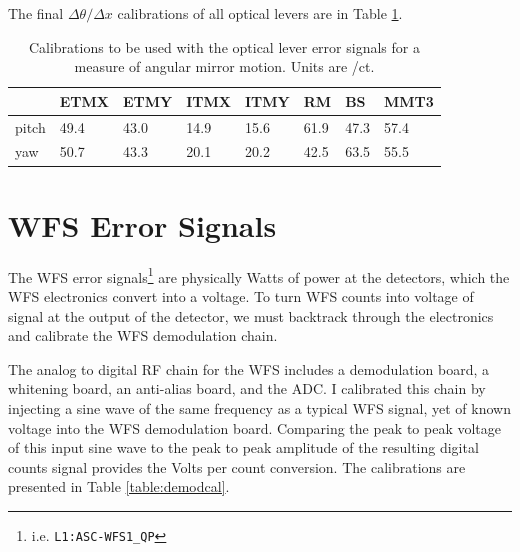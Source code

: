 The final $\Delta\theta / \Delta x$ calibrations of all optical levers
are in Table \ref{table:oplevcal}. 

\begin{table}
\centering
\caption[Optical lever calibrations]{Calibrations to be used
  with the optical lever error signals 
  for a measure of angular mirror motion. Units are \microrad/ct.}
\begin{tabular}{l l l l l l l l}
\hline
        & ETMX & ETMY & ITMX & ITMY & RM & BS & MMT3 \\
\hline
pitch & 49.4 & 43.0 & 14.9 & 15.6 & 61.9 & 47.3 & 57.4 \\
yaw & 50.7 & 43.3 & 20.1 & 20.2 & 42.5 & 63.5 & 55.5 \\
\hline
\end{tabular}
\label{table:oplevcal}
\end{table}



\section{WFS Error Signals}
\label{sec:cal_sensing}
The WFS error signals\footnote{i.e. \texttt{L1:ASC-WFS1\_QP}} are physically
Watts of power at the detectors, which the WFS electronics convert
into a voltage. To turn WFS counts into voltage of signal at the
output of the detector, we must backtrack through the electronics and
calibrate the WFS demodulation chain.


The analog to digital RF chain for the WFS includes a demodulation
board, a whitening board, an anti-alias board, and the ADC. I
calibrated this chain by injecting a sine wave of the same frequency
as a typical WFS signal, yet of known voltage into the WFS
demodulation board. Comparing the peak to peak voltage of this input
sine wave to the peak to peak amplitude of the resulting digital
counts signal provides the Volts per count conversion. The
calibrations are presented in Table \ref{table:demodcal}.

